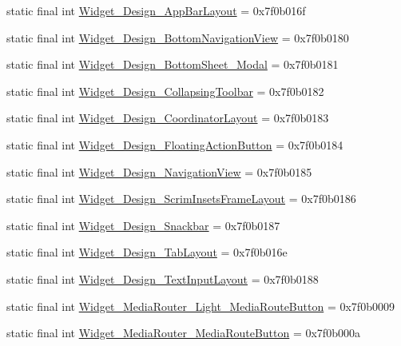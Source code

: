 \begin{CompactItemize}
\item 
static final int \hyperlink{classandroid_1_1support_1_1v7_1_1appcompat_1_1_r_1_1style_87110da78b0344be931873d20241e227}{Widget\_\-Design\_\-AppBarLayout} = 0x7f0b016f
\item 
static final int \hyperlink{classandroid_1_1support_1_1v7_1_1appcompat_1_1_r_1_1style_3415c3816da7eed2a592b37386aaca45}{Widget\_\-Design\_\-BottomNavigationView} = 0x7f0b0180
\item 
static final int \hyperlink{classandroid_1_1support_1_1v7_1_1appcompat_1_1_r_1_1style_5ea5397511c82067b3fdbc53850ccb43}{Widget\_\-Design\_\-BottomSheet\_\-Modal} = 0x7f0b0181
\item 
static final int \hyperlink{classandroid_1_1support_1_1v7_1_1appcompat_1_1_r_1_1style_86827a81be9acb7eb33fa3bab26e6f49}{Widget\_\-Design\_\-CollapsingToolbar} = 0x7f0b0182
\item 
static final int \hyperlink{classandroid_1_1support_1_1v7_1_1appcompat_1_1_r_1_1style_c241c5fba6fb5dc21f034256d85dbd55}{Widget\_\-Design\_\-CoordinatorLayout} = 0x7f0b0183
\item 
static final int \hyperlink{classandroid_1_1support_1_1v7_1_1appcompat_1_1_r_1_1style_b5d631359d96d0d9aef25d557a56ac17}{Widget\_\-Design\_\-FloatingActionButton} = 0x7f0b0184
\item 
static final int \hyperlink{classandroid_1_1support_1_1v7_1_1appcompat_1_1_r_1_1style_5fddc62a8f2bdb110debe7d10791610d}{Widget\_\-Design\_\-NavigationView} = 0x7f0b0185
\item 
static final int \hyperlink{classandroid_1_1support_1_1v7_1_1appcompat_1_1_r_1_1style_3b3a9681613e5ac68b2973ad869d81d4}{Widget\_\-Design\_\-ScrimInsetsFrameLayout} = 0x7f0b0186
\item 
static final int \hyperlink{classandroid_1_1support_1_1v7_1_1appcompat_1_1_r_1_1style_162299cb3e6f26e82675da3c377f44d4}{Widget\_\-Design\_\-Snackbar} = 0x7f0b0187
\item 
static final int \hyperlink{classandroid_1_1support_1_1v7_1_1appcompat_1_1_r_1_1style_dc3df68b2ddbd08e6ddf5fc1913cc156}{Widget\_\-Design\_\-TabLayout} = 0x7f0b016e
\item 
static final int \hyperlink{classandroid_1_1support_1_1v7_1_1appcompat_1_1_r_1_1style_85fbc7016a1cdf74541facdde956bdfb}{Widget\_\-Design\_\-TextInputLayout} = 0x7f0b0188
\item 
static final int \hyperlink{classandroid_1_1support_1_1v7_1_1appcompat_1_1_r_1_1style_8e3417b31bdc678c18c87f7758e47cfd}{Widget\_\-MediaRouter\_\-Light\_\-MediaRouteButton} = 0x7f0b0009
\item 
static final int \hyperlink{classandroid_1_1support_1_1v7_1_1appcompat_1_1_r_1_1style_ef996fd684083cddad128d750c746108}{Widget\_\-MediaRouter\_\-MediaRouteButton} = 0x7f0b000a
\end{CompactItemize}


